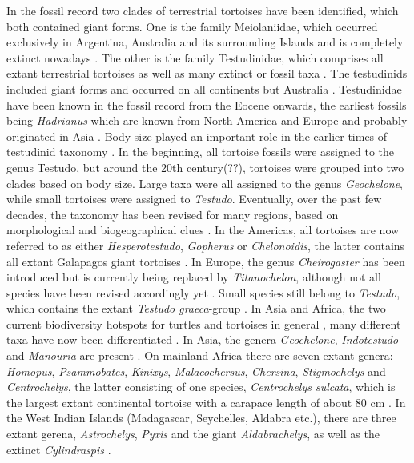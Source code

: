 In the fossil record two clades of terrestrial tortoises have been identified, which both contained giant forms. One is the family Meiolaniidae, which occurred exclusively in Argentina, Australia and its surrounding Islands and is completely extinct nowadays \citep{Anderson1025, Sterli2015}. The other is the family Testudinidae, which comprises all extant terrestrial tortoises as well as many extinct or fossil taxa \citep{.}. The testudinids included giant forms and occurred on all continents but Australia \citep{.}.
Testudinidae have been known in the fossil record from the Eocene onwards, the earliest fossils being \textit{Hadrianus} which are known from North America and Europe and probably originated in Asia \citep{Cope1872}.
Body size played an important role in the earlier times of testudinid taxonomy \citep{.}. In the beginning, all tortoise fossils were assigned to the genus Testudo, but around the 20th century(??), tortoises were grouped into two clades based on body size. Large taxa were all assigned to the genus \textit{Geochelone}, while small tortoises were assigned to \textit{Testudo}.
Eventually, over the past few decades, the taxonomy has been revised for many regions, based on morphological and biogeographical clues \citep{.}. In the Americas, all tortoises are now referred to as either \textit{Hesperotestudo}, \textit{Gopherus} or \textit{Chelonoidis}, the latter contains all extant Galapagos giant tortoises \citep{.}. In Europe, the genus \textit{Cheirogaster} has been introduced but is currently being replaced by \textit{Titanochelon}, although not all species have been revised accordingly yet \citep{.}. Small species still belong to \textit{Testudo}, which contains the extant \textit{Testudo graeca}-group \citep{.}.
In Asia and Africa, the two current biodiversity hotspots for turtles and tortoises in general \citep{.}, many different taxa have now been differentiated \citep{.}.
In Asia, the genera \textit{Geochelone}, \textit{Indotestudo} and \textit{Manouria} are present \citep{.}. On mainland Africa there are seven extant genera: \textit{Homopus}, \textit{Psammobates}, \textit{Kinixys}, \textit{Malacochersus}, \textit{Chersina}, \textit{Stigmochelys} and \textit{Centrochelys}, the latter consisting of one species, \textit{Centrochelys sulcata}, which is the largest extant continental tortoise with a carapace length of about 80 cm \citep{.}. In the West Indian Islands (Madagascar, Seychelles, Aldabra etc.), there are three extant gerena, \textit{Astrochelys}, \textit{Pyxis} and the giant \textit{Aldabrachelys}, as well as the extinct \textit{Cylindraspis} \citep{.}.

